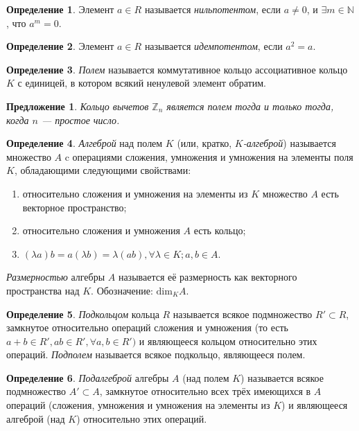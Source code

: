 \documentclass[a4paper]{article}
\theoremstyle{plain}
\newtheorem{proposal}{Предложение}
\theoremstyle{definition}
\newtheorem{definition}{Определение}
\numberwithin{definition}{section}
\numberwithin{proposal}{section}
\begin{document}
\begin{definition}
Элемент \(a \in R\) называется \emph{нильпотентом}, если \(a \neq 0\), и \(\exists m \in \mathbb{N}\), что \(a^m = 0\).
\end{definition}

\begin{definition}
Элемент \(a \in R\) называется \emph{идемпотентом}, если \(a^2 = a\).
\end{definition}

\begin{definition}
\emph{Полем} называется коммутативное кольцо ассоциативное кольцо \(K\) с единицей, в котором всякий ненулевой элемент обратим.
\end{definition}

\begin{proposal}
Кольцо вычетов \(\mathbb{Z}_n\) является полем тогда и только тогда, когда \(n\) --- простое число.
\end{proposal}

\begin{definition}
\emph{Алгеброй} над полем \(K\) (или, кратко, \emph{\(K\)-алгеброй}) называется множество \(A\) c операциями сложения, умножения и умножения на элементы поля \(K\), обладающими следующими свойствами:
\begin{enumerate}
	\item относительно сложения и умножения на элементы из \(K\) множество \(A\) есть векторное пространство;
	\item относительно сложения и умножения \(A\) есть кольцо;
	\item \((\lambda{}a)b = a(\lambda{}b) = \lambda(ab), \forall \lambda \in K; a,b \in A\).
\end{enumerate}

\emph{Размерностью} алгебры \(A\) называется её размерность как векторного пространства над \(K\). Обозначение: \(\mathrm{dim}_K A\).
\end{definition}

\begin{definition}
\emph{Подкольцом} кольца \(R\) называется всякое подмножество \(R' \subset R\), замкнутое относительно операций сложения и умножения (то есть \(a + b \in R', ab \in R', \forall a, b \in R')\) и являющееся кольцом относительно этих операций. \emph{Подполем} называется всякое подкольцо, являющееся полем.
\end{definition}

\begin{definition}
\emph{Подалгеброй} алгебры \(A\) (над полем \(K\)) называется всякое подмножество \(A' \subset A\), замкнутое относительно всех трёх имеющихся в \(A\) операций (сложения, умножения и умножения на элементы из \(K\)) и являющееся алгеброй (над \(K\)) относительно этих операций.
\end{definition}
\end{document}
